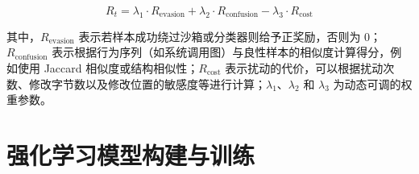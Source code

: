 \begin{equation}
	R_t = \lambda_1 \cdot R_{\text{evasion}} + \lambda_2 \cdot R_{\text{confusion}} - \lambda_3 \cdot R_{\text{cost}}
\end{equation}

其中，$R_{\text{evasion}}$ 表示若样本成功绕过沙箱或分类器则给予正奖励，否则为 0；$R_{\text{confusion}}$ 表示根据行为序列（如系统调用图）与良性样本的相似度计算得分，例如使用 Jaccard 相似度或结构相似性；$R_{\text{cost}}$ 表示扰动的代价，可以根据扰动次数、修改字节数以及修改位置的敏感度等进行计算；$\lambda_1$、$\lambda_2$ 和 $\lambda_3$ 为动态可调的权重参数。

\section{强化学习模型构建与训练}





